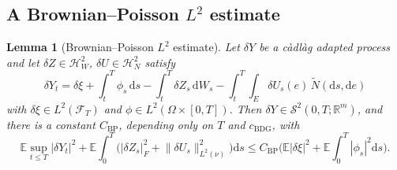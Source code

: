 \documentclass[preprint,12pt]{elsarticle}
\newcommand{\R}{\mathbb{R}}
\newcommand{\E}{\mathbb{E}}
\newcommand{\F}{\mathcal{F}}
\newcommand{\diff}{\mathrm{d}}
\newcommand{\Nt}{\widetilde{N}}
\newcommand{\Lnu}{L^2(\nu)}
\newcommand{\Ssp}[1]{\mathcal{S}^2(0,T;#1)}
\newcommand{\HW}{\mathcal{H}^2_W}
\newcommand{\HN}{\mathcal{H}^2_N}
\newcommand{\Lnorm}[1]{\lVert #1\rVert_{\Lnu}}
\numberwithin{equation}{section}
\theoremstyle{plain}
\newtheorem{lemma}[theorem]{Lemma}
\theoremstyle{definition}
\theoremstyle{\PaperRemarkStyle}
\begin{document}
\subsection{A Brownian--Poisson \texorpdfstring{$L^2$}{L2} estimate}

\begin{lemma}[Brownian--Poisson $L^2$ estimate]\label{lem:bpbsde}
Let $\delta Y$ be a c\`adl\`ag adapted process and let $\delta Z\in\HW$, $\delta U\in\HN$
satisfy
\begin{equation}\label{eq:dYlin}
\delta Y_t=\delta\xi+\int_t^T\phi_s\,\diff s-\int_t^T\delta Z_s\,\diff W_s-\int_t^T\!\int_E\delta U_s(e)\,\Nt(\diff s,\diff e)
\end{equation}
with $\delta\xi\in L^2(\F_T)$ and $\phi\in L^2(\Omega\times[0,T])$. Then
$\delta Y\in\Ssp{\R^m}$, and there is a constant
$C_{\mathrm{BP}}$, depending only on $T$ and $c_{\mathrm{BDG}}$, with
\[
\E\sup_{t\le T}|\delta Y_t|^2+\E\!\int_0^T\!\big(|\delta Z_s|_F^2+\Lnorm{\delta U_s}^2\big)\diff s
\le C_{\mathrm{BP}}\Big(\E|\delta\xi|^2+\E\!\int_0^T|\phi_s|^2\diff s\Big).
\]
\end{lemma}
\end{document}
